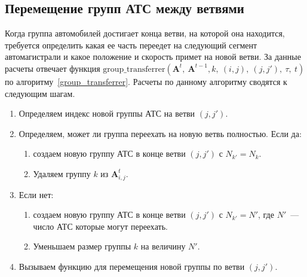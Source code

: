 \subsection{Перемещение групп АТС между ветвями}
Когда группа автомобилей достигает конца ветви, на которой она находится, требуется определить какая ее часть переедет на
следующий сегмент автомагистрали и какое положение и скорость примет на новой ветви.
За данные расчеты отвечает функция $\text{group\_transferrer}(\mathbf{A}^t,\ \mathbf{A}^{t-1}, k,\ (i,j),\ (j,j'),\ \tau,\ t)$ по алгоритму~\ref{group_transferrer}.
Расчеты по данному алгоритму сводятся к следующим шагам.
\begin{enumerate}[leftmargin=2.05cm,label=Шаг \arabic*.,ref=\arabic*]
  \item Определяем индекс новой группы АТС на ветви $(j,j')$.
  \item Определяем, может ли группа переехать на новую ветвь полностью. Если да:
  \begin{enumerate}
    \item создаем новую группу АТС в конце ветви $(j,j')$ с $N_{k'} = N_k$.
    \item Удаляем группу $k$ из $\mathbf{A}^t_{i,j}$.
  \end{enumerate}
  \item Если нет:
    \begin{enumerate}
    \item создаем новую группу АТС в конце ветви $(j,j')$ с $N_{k'} = N'$, где $N'$~--- число АТС которые могут переехать.
    \item Уменьшаем размер группы $k$ на величину $N'$.
  \end{enumerate}
  \item Вызываем функцию для перемещения новой группы по ветви $(j,j')$.
\end{enumerate}

